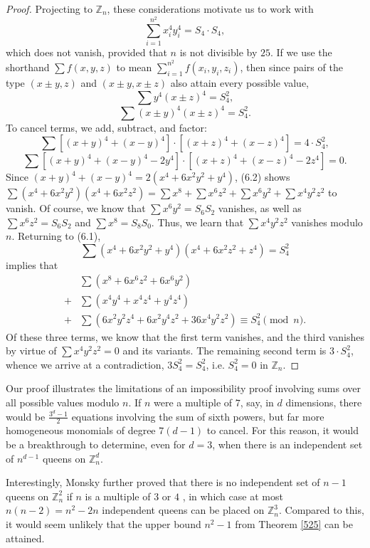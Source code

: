 \documentclass[11pt]{article}
\begin{document}
\begin{proof}
Projecting to $\mathbb{Z}_n$, these considerations motivate us to work with
$$\sum_{i=1}^{n^2} x_i^4 y_i^4=S_4\cdot S_4,$$
which does not vanish, provided that $n$ is not divisible by $25$. If we use the shorthand $\sum f(x,y,z)$ to mean $\sum_{i=1}^{n^2} f(x_i,y_i,z_i)$, then since pairs of the type $(x\pm y,z)$ and $(x\pm y,x\pm z)$ also attain every possible value,
$$\sum y^4(x\pm z)^4=S_4^2,$$
$$\sum (x\pm y)^4(x\pm z)^4=S_4^2.$$
To cancel terms, we add, subtract, and factor:
\begin{equation}
\sum \left[(x+y)^4+(x-y)^4\right]\cdot \left[(x+z)^4+(x-z)^4\right]=4\cdot S_4^2,
\end{equation}
\begin{equation}
\sum \left[(x+y)^4+(x-y)^4-2y^4\right]\cdot \left[(x+z)^4+(x-z)^4-2z^4\right]= 0.
\end{equation}
Since $(x+y)^4+(x-y)^4=2(x^4+6x^2y^2+y^4)$, (6.2) shows $\sum (x^4+6x^2y^2)(x^4+6x^2z^2)=\sum x^8+\sum x^6z^2+\sum x^6y^2+\sum x^4y^2z^2$ to vanish. Of course, we know that $\sum x^6y^2=S_6S_2$ vanishes, as well as $\sum x^6z^2=S_6S_2$ and $\sum x^8=S_8S_0$. Thus, we learn that $\sum x^4y^2z^2$ vanishes modulo $n$. Returning to (6.1),
$$\sum (x^4+6x^2y^2+y^4)(x^4+6x^2z^2+z^4)=S_4^2$$
implies that
\begin{align*}
    & \sum (x^8+6x^6z^2+6x^6y^2) \\
    + &\sum (x^4y^4+x^4z^4+y^4z^4)\\
    + & \sum (6x^2y^2z^4+6x^2y^4z^2+36x^4y^2z^2)\equiv S_4^2 \pmod n.
\end{align*}
Of these three terms, we know that the first term vanishes, and the third vanishes by virtue of $\sum x^4y^2z^2=0$ and its variants. The remaining second term is $3\cdot S_4^2$, whence we arrive at a contradiction, $3S_4^2=S_4^2$, i.e. $S_4^2=0$ in $\mathbb{Z}_n$.
\end{proof}

Our proof illustrates the limitations of an impossibility proof involving sums over all possible values modulo $n$. If $n$ were a multiple of $7$, say, in $d$ dimensions, there would be $\frac{3^d-1}{2}$ equations involving the sum of sixth powers, but far more homogeneous monomials of degree $7(d-1)$ to cancel. For this reason, it would be a breakthrough to determine, even for $d=3$, when there is an independent set of $n^{d-1}$ queens on $\mathbb{Z}_n^d$.

Interestingly, Monsky further proved that there is no independent set of $n-1$ queens on $\mathbb{Z}_n^2$ if $n$ is a multiple of $3$ or $4$ \cite{Mon}, in which case at most $n(n-2)=n^2-2n$ independent queens can be placed on $\mathbb{Z}_n^3$. Compared to this, it would seem unlikely that the upper bound $n^2-1$ from Theorem \ref{525} can be attained.
\end{document}
